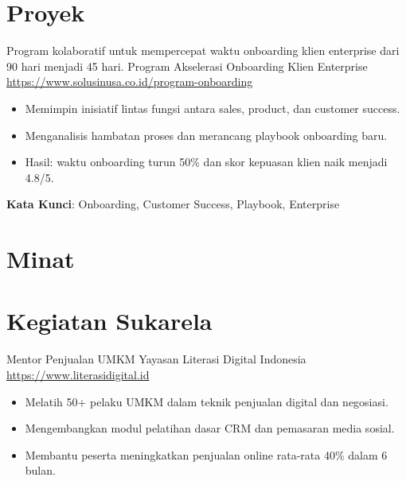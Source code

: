 \documentclass[a4paper, serif, 10pt]{moderncv}
\begin{document}
\section{Proyek}

        {Program kolaboratif untuk mempercepat waktu onboarding klien enterprise dari 90 hari menjadi 45 hari.}
        {Program Akselerasi Onboarding Klien Enterprise}
        {\url{https://www.solusinusa.co.id/program-onboarding}}
        {}
        {\begin{itemize}
\item Memimpin inisiatif lintas fungsi antara sales, product, dan customer success.
\item Menganalisis hambatan proses dan merancang playbook onboarding baru.
\item Hasil: waktu onboarding turun 50\% dan skor kepuasan klien naik menjadi 4.8/5.
\end{itemize}
\textbf{Kata Kunci}: Onboarding, Customer Success, Playbook, Enterprise}
\section{Minat}

\section{Kegiatan Sukarela}

        {Mentor Penjualan UMKM}
        {Yayasan Literasi Digital Indonesia}
        {\url{https://www.literasidigital.id}}
        {}
        {\begin{itemize}
\item Melatih 50+ pelaku UMKM dalam teknik penjualan digital dan negosiasi.
\item Mengembangkan modul pelatihan dasar CRM dan pemasaran media sosial.
\item Membantu peserta meningkatkan penjualan online rata-rata 40\% dalam 6 bulan.
\end{itemize}}
    
\end{document}
